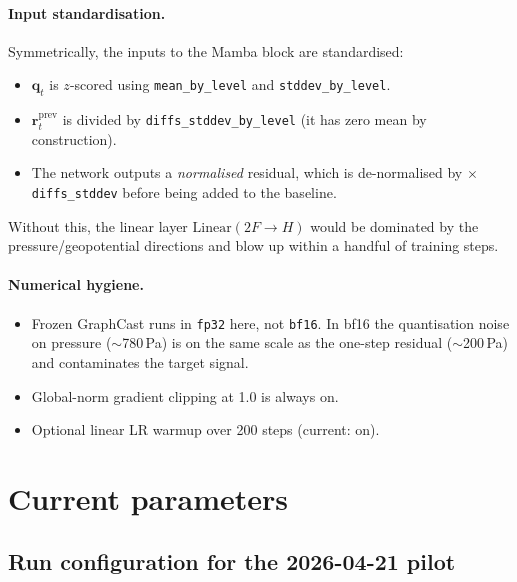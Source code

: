 \documentclass[11pt,a4paper]{article}
\begin{document}
\paragraph{Input standardisation.}
Symmetrically, the inputs to the Mamba block are standardised:
\begin{itemize}[nosep]
  \item $\mathbf{q}_t$ is $z$-scored using \texttt{mean\_by\_level} and \texttt{stddev\_by\_level}.
  \item $\mathbf{r}^{\text{prev}}_t$ is divided by \texttt{diffs\_stddev\_by\_level} (it has zero mean by construction).
  \item The network outputs a \emph{normalised} residual, which is de-normalised by $\times$\texttt{diffs\_stddev} before being added to the baseline.
\end{itemize}
Without this, the linear layer $\text{Linear}(2F{\to}H)$ would be dominated by the pressure/geopotential directions and blow up within a handful of training steps.

\paragraph{Numerical hygiene.}
\begin{itemize}[nosep]
  \item Frozen GraphCast runs in \texttt{fp32} here, not \texttt{bf16}. In bf16 the quantisation noise on pressure ($\sim$780\,Pa) is on the same scale as the one-step residual ($\sim$200\,Pa) and contaminates the target signal.
  \item Global-norm gradient clipping at 1.0 is always on.
  \item Optional linear LR warmup over 200 steps (current: on).
\end{itemize}

\section{Current parameters}

\subsection{Run configuration for the 2026-04-21 pilot}
\end{document}
